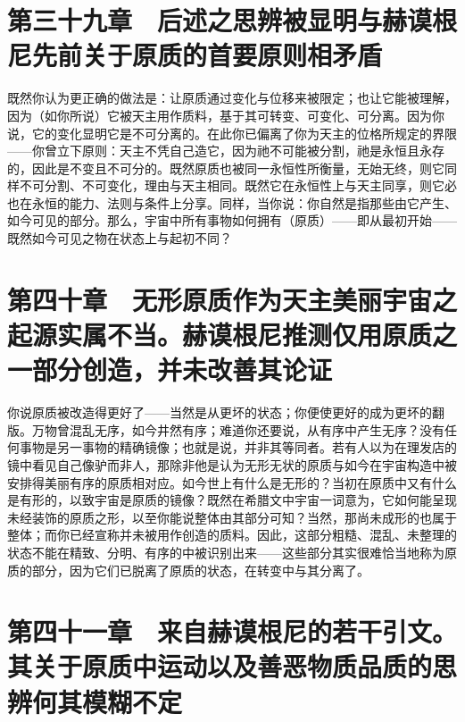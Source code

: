 
\section{第三十九章　后述之思辨被显明与赫谟根尼先前关于原质的首要原则相矛盾}

既然你认为更正确的做法是：让原质通过变化与位移来被限定；也让它能被理解，因为（如你所说）它被天主用作质料，基于其可转变、可变化、可分离。因为你说，它的变化显明它是不可分离的。在此你已偏离了你为天主的位格所规定的界限——你曾立下原则：天主不凭自己造它，因为祂不可能被分割，祂是永恒且永存的，因此是不变且不可分的。既然原质也被同一永恒性所衡量，无始无终，则它同样不可分割、不可变化，理由与天主相同。既然它在永恒性上与天主同享，则它必也在永恒的能力、法则与条件上分享。同样，当你说：你自然是指那些由它产生、如今可见的部分。那么，宇宙中所有事物如何拥有（原质）——即从最初开始——既然如今可见之物在状态上与起初不同？\par


\section{第四十章　无形原质作为天主美丽宇宙之起源实属不当。赫谟根尼推测仅用原质之一部分创造，并未改善其论证}

你说原质被改造得更好了——当然是从更坏的状态；你便使更好的成为更坏的翻版。万物曾混乱无序，如今井然有序；难道你还要说，从有序中产生无序？没有任何事物是另一事物的精确镜像；也就是说，并非其等同者。若有人以为在理发店的镜中看见自己像驴而非人，那除非他是认为无形无状的原质与如今在宇宙构造中被安排得美丽有序的原质相对应。如今世上有什么是无形的？当初在原质中又有什么是有形的，以致宇宙是原质的镜像？既然在希腊文中宇宙一词意为，它如何能呈现未经装饰的原质之形，以至你能说整体由其部分可知？当然，那尚未成形的也属于整体；而你已经宣称并未被用作创造的质料。因此，这部分粗糙、混乱、未整理的状态不能在精致、分明、有序的中被识别出来——这些部分其实很难恰当地称为原质的部分，因为它们已脱离了原质的状态，在转变中与其分离了。\par


\section{第四十一章　来自赫谟根尼的若干引文。其关于原质中运动以及善恶物质品质的思辨何其模糊不定}

